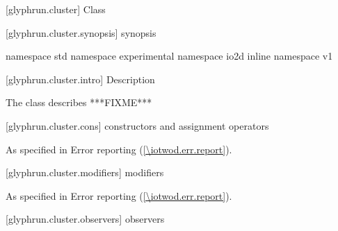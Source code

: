 
 [glyphrun.cluster] {Class }

 [glyphrun.cluster.synopsis] { synopsis}

\begin{codeblock}
namespace std { namespace experimental { namespace io2d { inline namespace v1 {
} } } }
\end{codeblock}

 [glyphrun.cluster.intro] { Description}

\pnum
{}
The  class describes ***FIXME***

 [glyphrun.cluster.cons] { constructors and assignment operators}

\begin{itemdecl}
\end{itemdecl}
\begin{itemdescr}
\pnum
\effects

\pnum
\throws
As specified in Error reporting (\ref{\iotwod.err.report}).

\pnum
\remarks

\pnum
\errors

\pnum
\realnotes

\end{itemdescr}

 [glyphrun.cluster.modifiers] { modifiers}

\begin{itemdecl}
\end{itemdecl}
\begin{itemdescr}
\pnum
\effects

\pnum
\throws
As specified in Error reporting (\ref{\iotwod.err.report}).

\pnum
\remarks

\pnum
\errors

\pnum
\realnotes

\end{itemdescr}

 [glyphrun.cluster.observers] { observers}

\begin{itemdecl}
\end{itemdecl}
\begin{itemdescr}
\pnum
\returns

\end{itemdescr}
